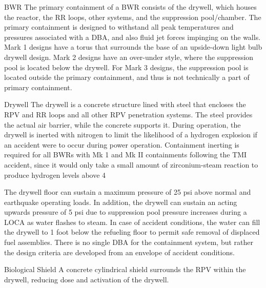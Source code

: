 \documentclass[10pt]{article}
\begin{document}
BWR
The primary containment of a BWR consists of the drywell, which houses the reactor, the RR loops, other systems, and the suppression pool/chamber. The primary containment is designed to withstand all peak temperatures and pressures associated with a DBA, and also fluid jet forces impinging on the walls. Mark 1 designs have a torus that surrounds the base of an upside-down light bulb drywell design. Mark 2 designs have an over-under style, where the suppression pool is located below the drywell.  For Mark 3 designs, the suppression pool is located outside the primary containment, and thus is not technically a part of primary containment. 

Drywell
The drywell is a concrete structure lined with steel that encloses the RPV and RR loops and all other RPV penetration systems. The steel provides the actual air barrier, while the concrete supports it. During operation, the drywell is inerted with nitrogen to limit the likelihood of a hydrogen explosion if an accident were to occur during power operation. Containment inerting is required for all BWRs with Mk 1 and Mk II containments following the TMI accident, since it would only take a small amount of zirconium-steam reaction to produce hydrogen levels above 4%

The drywell floor can sustain a maximum pressure of 25 psi above normal and earthquake operating loads. In addition, the drywell can sustain an acting upwards pressure of 5 psi due to suppression pool pressure increases during a LOCA as water flashes to steam. In case of accident conditions, the water can fill the drywell to 1 foot below the refueling floor to permit safe removal of displaced fuel assemblies. There is no single DBA for the containment system, but rather the design criteria are developed from an envelope of accident conditions. 

Biological Shield
A concrete cylindrical shield surrounds the RPV within the drywell, reducing dose and activation of the drywell. 
\end{document}
